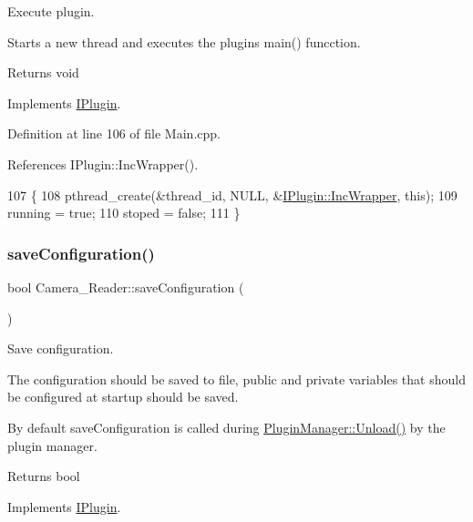 Execute plugin. 

Starts a new thread and executes the plugins main() funcction. \begin{DoxyReturn}{Returns}
void 
\end{DoxyReturn}


Implements \hyperlink{class_i_plugin_a46b4ace767e77f9db9c9585e99c09039}{I\+Plugin}.



Definition at line 106 of file Main.\+cpp.



References I\+Plugin\+::\+Inc\+Wrapper().


\begin{DoxyCode}
107 \{
108     pthread\_create(&thread\_id, NULL, &\hyperlink{class_i_plugin_a62d22be2fdf66eb7f5c2f797f5f3d7f3}{IPlugin::IncWrapper}, \textcolor{keyword}{this});
109     running = \textcolor{keyword}{true};
110     stoped = \textcolor{keyword}{false};
111 \}
\end{DoxyCode}
\mbox{\label{class_camera___reader_a3e7d14b675846c5094311985a0c1e735}} 
\subsubsection{\texorpdfstring{save\+Configuration()}{saveConfiguration()}}
{\footnotesize\ttfamily bool Camera\+\_\+\+Reader\+::save\+Configuration (\begin{DoxyParamCaption}{ }\end{DoxyParamCaption})\hspace{0.3cm}{\ttfamily [virtual]}}



Save configuration. 

The configuration should be saved to file, public and private variables that should be configured at startup should be saved.

By default save\+Configuration is called during \hyperlink{class_plugin_manager_ab651a05d6fcb92562807e9f5ecc30855}{Plugin\+Manager\+::\+Unload()} by the plugin manager.

\begin{DoxyReturn}{Returns}
bool 
\end{DoxyReturn}


Implements \hyperlink{class_i_plugin_a79b5c42b1c7b08257a6110b2091039bc}{I\+Plugin}.



